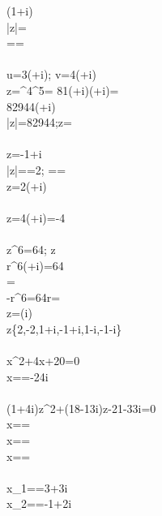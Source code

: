 (1+i)\\
|z|=\\
==
\\\Large{}\normalsize\\
u=3(+i);
v=4(+i)\\
z=^4\cdot{}^5=
81(+i)(+i)=\\
82944(+i)\\
|z|=82944;\arg z=
\\\Large{}\normalsize\\
z=-1+i\\
|z|==2;
==\\
z=2(+i)
\\\Large{}\normalsize\\
z=4(\cos{\pi}+i\sin{\pi})=-4
\\\Large{}\normalsize\\
z^6=64; z\in\cnums\\
r^6(\cos{6\varphi}+i\sin{6\varphi})=64\\
\varphi=\pm{}\\
-r^6=64\rArr r=\\
z=(\pm i)\\
z\in\{2,-2,1+i,-1+i,1-i,-1-i\}
\\\Large{}\normalsize\\
x^2+4x+20=0\\
x==-2\pm4i
\\\Large{}\normalsize\\
(1+4i)z^2+(18-13i)z-21-33i=0\\
x==\\
x==\\
x==\\
\\
x_1==3+3i\\
x_2==-1+2i
\\\Large{}\normalsize\\
